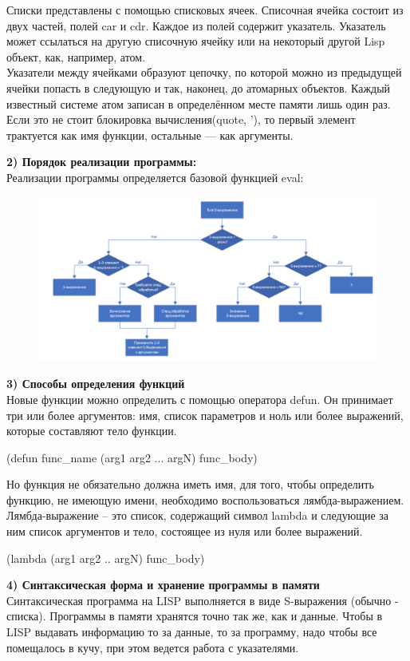 \documentclass[a4paper, 12pt]{article}
\begin{document}
\hspace*{-6mm}Списки представлены с помощью списковых ячеек. Списочная ячейка состоит из двух частей, полей car и cdr. Каждое из полей содержит указатель. Указатель может ссылаться на другую списочную ячейку или на некоторый другой Lisp объект, как, например, атом.
\\ Указатели между ячейками образуют цепочку, по которой можно из предыдущей ячейки попасть в следующую и так, наконец, до атомарных объектов. Каждый известный системе атом записан в определённом месте памяти лишь один раз.
\\Если это  не стоит блокировка вычисления(quote, '), то первый элемент трактуется как имя функции, остальные — как аргументы.

\hspace*{-13mm} \textbf{2) Порядок реализации программы:}
\\ Реализации программы определяется базовой функцией eval:
\clearpage
\newpage
\begin{figure}[h!]
	\centering \includegraphics[scale=0.7]{eval}
\end{figure}
\hspace*{-8mm} \textbf{3) Способы определения функций}
\\Новые функции можно определить с помощью оператора defun. Он принимает три или более аргументов: имя, список параметров и ноль или более выражений, которые составляют тело функции. 

(defun func\_name (arg1 arg2 ... argN) func\_body)

Но функция не обязательно должна иметь имя, для того, чтобы определить функцию, не имеющую имени, необходимо воспользоваться лямбда-выражением. Лямбда-выражение – это список, содержащий символ lambda и следующие за ним список аргументов и тело, состоящее из нуля или более выражений.

(lambda (arg1 arg2 .. argN) func\_body)

\hspace*{-8mm} \textbf{4) Синтаксическая форма и хранение программы в памяти}
\\Синтаксическая программа на LISP выполняется в виде S-выражения (обычно - списка). Программы в памяти хранятся точно так же, как и данные. Чтобы в LISP выдавать информацию то за данные, то за программу, надо чтобы все помещалось в кучу, при этом ведется работа с указателями.
\end{document}
